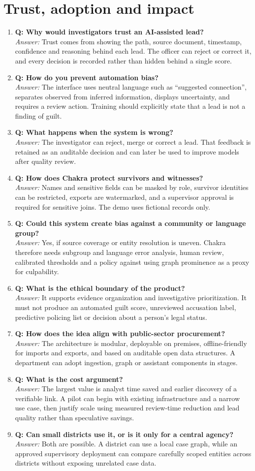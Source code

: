 \documentclass[10pt,a4paper]{article}
\newcommand{\qa}[2]{\item \textbf{\color{navy}Q: #1}\\[-1pt]{\color{coral}\textit{Answer:}} #2}
\begin{document}
\section{Trust, adoption and impact}
\begin{enumerate}[resume]
\qa{Why would investigators trust an AI-assisted lead?}{Trust comes from showing the path, source document, timestamp, confidence and reasoning behind each lead. The officer can reject or correct it, and every decision is recorded rather than hidden behind a single score.}
\qa{How do you prevent automation bias?}{The interface uses neutral language such as ``suggested connection'', separates observed from inferred information, displays uncertainty, and requires a review action. Training should explicitly state that a lead is not a finding of guilt.}
\qa{What happens when the system is wrong?}{The investigator can reject, merge or correct a lead. That feedback is retained as an auditable decision and can later be used to improve models after quality review.}
\qa{How does Chakra protect survivors and witnesses?}{Names and sensitive fields can be masked by role, survivor identities can be restricted, exports are watermarked, and a supervisor approval is required for sensitive joins. The demo uses fictional records only.}
\qa{Could this system create bias against a community or language group?}{Yes, if source coverage or entity resolution is uneven. Chakra therefore needs subgroup and language error analysis, human review, calibrated thresholds and a policy against using graph prominence as a proxy for culpability.}
\qa{What is the ethical boundary of the product?}{It supports evidence organization and investigative prioritization. It must not produce an automated guilt score, unreviewed accusation label, predictive policing list or decision about a person's legal status.}
\qa{How does the idea align with public-sector procurement?}{The architecture is modular, deployable on premises, offline-friendly for imports and exports, and based on auditable open data structures. A department can adopt ingestion, graph or assistant components in stages.}
\qa{What is the cost argument?}{The largest value is analyst time saved and earlier discovery of a verifiable link. A pilot can begin with existing infrastructure and a narrow use case, then justify scale using measured review-time reduction and lead quality rather than speculative savings.}
\qa{Can small districts use it, or is it only for a central agency?}{Both are possible. A district can use a local case graph, while an approved supervisory deployment can compare carefully scoped entities across districts without exposing unrelated case data.}

\end{enumerate}
\end{document}
